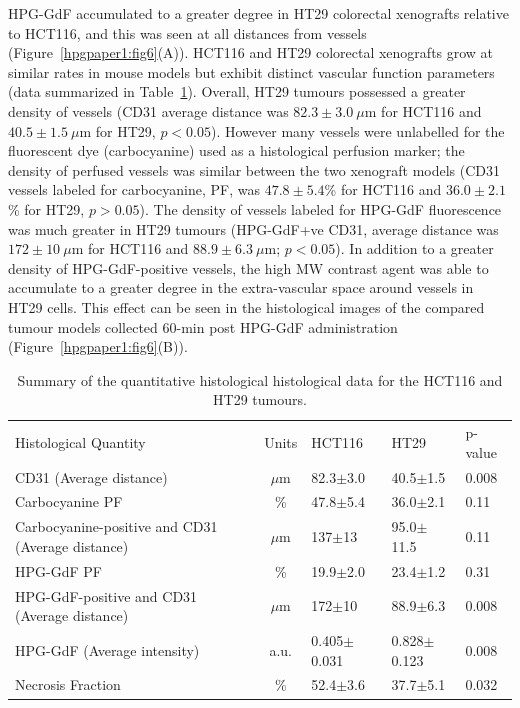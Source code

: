 HPG-GdF accumulated to a greater degree in HT29 colorectal xenografts relative to HCT116, and this was seen at all distances from vessels (Figure~\ref{hpgpaper1:fig6}(A)).
HCT116 and HT29 colorectal xenografts grow at similar rates in mouse models but exhibit distinct vascular function parameters (data summarized in Table~\ref{hpgpaper:table1}).
Overall, HT29 tumours possessed a greater density of vessels (\acs{CD31} average distance was $82.3\pm 3.0~\mu$m for HCT116 and $40.5\pm 1.5~\mu$m for HT29, $p<0.05$).
However many vessels were unlabelled for the fluorescent dye (carbocyanine) used as a histological perfusion marker; the density of perfused vessels was similar between the two xenograft models (\acs{CD31} vessels labeled for carbocyanine, PF, was $47.8\pm 5.4$\% for HCT116 and $36.0\pm 2.1$\% for HT29, $p>0.05$).
The density of vessels labeled for \acs{HPG-GdF} fluorescence was much greater in HT29 tumours (HPG-GdF+ve \acs{CD31}, average distance was $172\pm 10~\mu$m for HCT116 and $88.9\pm 6.3~\mu$m; $p < 0.05$).
In addition to a greater density of \acs{HPG-GdF}-positive vessels, the high \acs{MW} contrast agent was able to accumulate to a greater degree in the extra-vascular space around vessels in HT29 cells.
This effect can be seen in the histological images of the compared tumour models collected 60-min post \acs{HPG-GdF} administration (Figure~\ref{hpgpaper1:fig6}(B)).

\begin{table}[htbp]
\begin{center}
    \begin{tabular}{@{}p{3.2cm}clll@{}}
    \rowcolor{gray!50}
Histological Quantity & Units & HCT116 & HT29 & p-value  \\
CD31 \newline(Average distance) & $\mu$m & 82.3$\pm$3.0    & 40.5$\pm$1.5    & 0.008 \\
Carbocyanine \acs{PF} & \%                        & 47.8$\pm$5.4    & 36.0$\pm$2.1    & 0.11    \\
Carbocyanine-positive and CD31 (Average distance)                           & $\mu$m               & 137$\pm$13      & 95.0$\pm$11.5   & 0.11    \\
\acs{HPG-GdF} \acs{PF}                        & \%                        & 19.9$\pm$2.0    & 23.4$\pm$1.2    & 0.31    \\
\acs{HPG-GdF}-positive and CD31  (Average distance) & $\mu$m               & 172$\pm$10      & 88.9$\pm$6.3    & 0.008\\
\acs{HPG-GdF} (Average intensity) & a.u. & 0.405$\pm$0.031 & 0.828$\pm$0.123 & 0.008 \\
Necrosis Fraction                                        & \%                       & 52.4$\pm$3.6    & 37.7$\pm$5.1    & 0.032 
\end{tabular}
\caption{Summary of the quantitative histological histological data for the HCT116 and HT29 tumours.}
\label{hpgpaper:table1}
\end{center}
\end{table}


